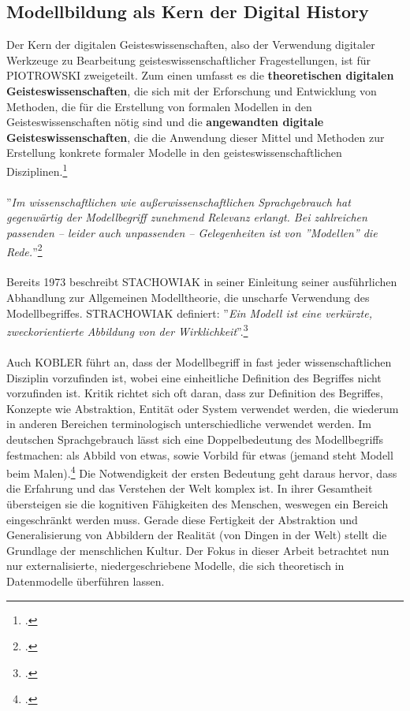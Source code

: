 \documentclass[12pt,a4paper]{article}
\begin{document}
\subsection{Modellbildung als Kern der Digital History}
\label{Modellbildung}
Der  Kern der digitalen Geisteswissenschaften, also der Verwendung digitaler Werkzeuge zu Bearbeitung geisteswissenschaftlicher Fragestellungen, ist für PIOTROWSKI zweigeteilt. Zum einen umfasst es die \textbf{theoretischen digitalen Geisteswissenschaften}, die sich mit der Erforschung und Entwicklung von Methoden, die für die Erstellung von formalen Modellen in den Geisteswissenschaften nötig sind und die \textbf{angewandten digitale Geisteswissenschaften}, die die Anwendung dieser Mittel und Methoden zur Erstellung konkrete formaler Modelle in den geisteswissenschaftlichen Disziplinen.\footcite{piotrowski2016digital}
\\
\\
''\textit{Im wissenschaftlichen wie außerwissenschaftlichen Sprachgebrauch hat gegenwärtig der Modellbegriff zunehmend Relevanz erlangt. Bei zahlreichen passenden -- leider auch unpassenden -- Gelegenheiten ist von ''Modellen'' die Rede.}''\footcite[][S.1]{stachowiak1973allgemeine}
\\
\\
Bereits 1973 beschreibt STACHOWIAK in seiner Einleitung seiner ausführlichen Abhandlung zur Allgemeinen Modelltheorie, die unscharfe Verwendung des Modellbegriffes. STRACHOWIAK definiert: ''\textit{Ein Modell ist eine verkürzte, zweckorientierte Abbildung von der Wirklichkeit}''.\footcite[][]{stachowiak1973allgemeine}
\\
\\
Auch KOBLER führt an, dass der Modellbegriff in fast jeder wissenschaftlichen Disziplin vorzufinden ist, wobei eine einheitliche Definition des Begriffes nicht vorzufinden ist. Kritik richtet sich oft daran, dass zur Definition des Begriffes, Konzepte wie Abstraktion, Entität oder System verwendet werden, die wiederum in anderen Bereichen terminologisch unterschiedliche verwendet werden.
Im deutschen Sprachgebrauch lässt sich eine Doppelbedeutung des Modellbegriffs festmachen: als Abbild von etwas, sowie Vorbild für etwas (jemand steht Modell beim Malen).\footcite[][S.129]{stachowiak1973allgemeine} Die Notwendigkeit der ersten Bedeutung geht daraus hervor, dass die Erfahrung und das Verstehen der Welt komplex ist. In ihrer Gesamtheit übersteigen sie die kognitiven Fähigkeiten des Menschen, weswegen ein Bereich eingeschränkt werden muss. Gerade diese Fertigkeit der Abstraktion und Generalisierung von Abbildern der Realität (von Dingen in der Welt) stellt die Grundlage der menschlichen Kultur. Der Fokus in dieser Arbeit betrachtet nun nur externalisierte, niedergeschriebene Modelle, die sich theoretisch in Datenmodelle überführen lassen. 
\end{document}
